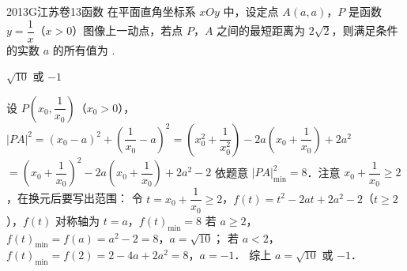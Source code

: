 
\begin{problem}{2013}{G}{江苏卷}{13}{函数}
在平面直角坐标系 $ xOy $ 中，设定点 $ A(a,a) $，$ P $ 是函数 $ y=\dfrac{1}{x} $（$ x>0 $）图像上一动点，若点 $ P $，$ A $ 之间的最短距离为 $ 2\sqrt{2} $，则满足条件的实数 $ a $ 的所有值为 \underline{\hspace{4em}}.
\end{problem}

\begin{answer}
$ \sqrt{10} $ 或 $ -1 $
\end{answer}

\begin{solutions}
设 $ P\left(x_0,\dfrac{1}{x_0}\right) $（$ x_0>0 $），  
$ |PA|^2=(x_0-a)^2+\left(\dfrac{1}{x_0}-a\right)^2=\left(x_0^2+\dfrac{1}{x_0^2}\right)-2a\left(x_0+\dfrac{1}{x_0}\right)+2a^2 $  
$ =\left(x_0+\dfrac{1}{x_0}\right)^2-2a\left(x_0+\dfrac{1}{x_0}\right)+2a^2-2 $  
依题意 $ |PA|_{\min}^2=8 $．注意 $ x_0+\dfrac{1}{x_0}\geqslant 2 $，在换元后要写出范围：  
令 $ t=x_0+\dfrac{1}{x_0}\geqslant 2 $，$ f(t)=t^2-2at+2a^2-2 $（$ t\geqslant 2 $），$ f(t) $ 对称轴为 $ t=a $，$ f(t)_{\min}=8 $  
若 $ a\geqslant 2 $，$ f(t)_{\min}=f(a)=a^2-2=8 $，$ a=\sqrt{10} $；  
若 $ a<2 $，$ f(t)_{\min}=f(2)=2-4a+2a^2=8 $，$ a=-1 $．  
综上 $ a=\sqrt{10} $ 或 $ -1 $．
\end{solutions}